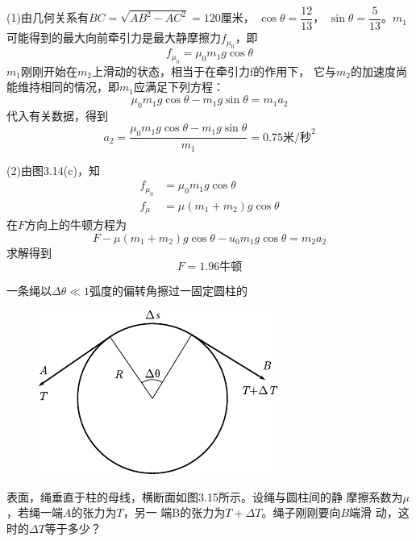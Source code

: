 (1)由几何关系有$  B C = \sqrt { A B ^ { 2 } - A C ^ { 2 } } = 1 2 0  $厘米，
$ \cos \theta = \dfrac { 1 2 } { 1 3 } $，
$ \sin \theta = \dfrac { 5 } { 1 3 } $。$ m _ { 1 }  $
可能得到的最大向前牵引力是最大静摩擦力$  f _ { \mu _ 0 }  $，即
\clearpage
~\vspace{-1.56em}
\begin{equation*}
	f _ {\mu _ 0 } = \mu _ { 0 } m _ { 1 } g \cos \theta
\end{equation*}
$m_1$刚刚开始在$m_2$上滑动的状态，相当于在牵引力f的作用下，
它与$m_2$的加速度尚能维持相同的情况，即$m_1$应满足下列方程：
\begin{equation*}
	\mu _ { 0 } m _ { 1 } g \cos \theta - m _ { 1 } g \sin \theta = m _ { 1 } a _ { 2 }
\end{equation*}
代入有关数据，得到
\begin{equation*}
	a _ { 2 } = \frac { \mu_{ 0 } m_1 g \cos \theta - m _ { 1 } g \sin \theta } { m _ { 1 } } = 0 . 7 5 \text{米/秒}^2
\end{equation*}

(2)由图3.14(c)，知
\begin{align*}
	f _ { \mu _ 0 } &= \mu _ { 0 } m _ { 1 } g \cos \theta \\
    f _ { \mu } &= \mu ( m _ { 1 } + m _ { 2 } ) g \cos \theta
\end{align*}
在$ F $方向上的牛顿方程为
\begin{equation*}
    F - \mu ( m _ { 1 } + m _ { 2 } ) g \cos \theta - u _ { 0 } m _ { 1 } g \cos \theta = m _ { 2 } a _ { 2 }
\end{equation*}
求解得到
\begin{equation*}
    F = 1 . 9 6 \text{牛顿}
\end{equation*}

\example 一条绳以$  \Delta \theta \ll 1  $弧度的偏转角擦过一固定圆柱的
\begin{figure}
	\centering
	\includegraphics{figure/fig03.15}
	\caption{}
	\label{fig:03.15}
\end{figure}
表面，绳垂直于柱的母线，横断面如图3.15所示。设绳与圆柱间的静
摩擦系数为$\mu$，若绳一端$ A $的张力为$ T $，另一
端B的张力为$  T + \Delta T $。绳子刚刚要向$ B $端滑
动，这时的$  \Delta T  $等于多少？

